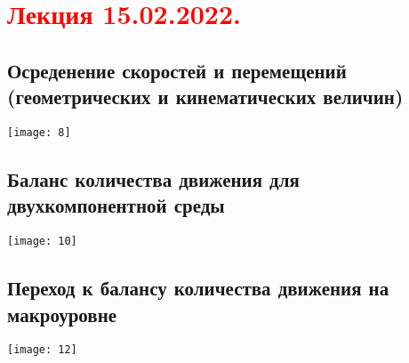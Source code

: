 \documentclass[main.tex]{subfiles}
\begin{document}
\section{\textcolor{red}{Лекция 15.02.2022.}}

\subsection{Осреденение скоростей и перемещений (геометрических и кинематических величин)}
\texttt{[image: 8]}



\subsection{Баланс количества движения для двухкомпонентной среды}
\texttt{[image: 10]}


\subsection{Переход к балансу количества движения на макроуровне}
\texttt{[image: 12]}
\end{document}
